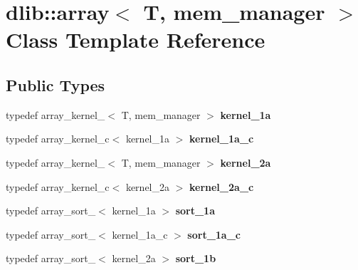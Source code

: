 \hypertarget{classdlib_1_1array}{
\section{dlib::array$<$ T, mem\_\-manager $>$ Class Template Reference}
\label{classdlib_1_1array}
}
\subsection*{Public Types}
\begin{DoxyCompactItemize}
\item 
\hypertarget{classdlib_1_1array_adc0c8cb12a28d10432a13d9eb4c6a487}{
typedef array\_\-kernel\_$<$ T, mem\_\-manager $>$ {\bfseries kernel\_\-1a}}
\label{classdlib_1_1array_adc0c8cb12a28d10432a13d9eb4c6a487}

\item 
\hypertarget{classdlib_1_1array_a5d1b2ce2c97c5ce3457e187ff5c36faa}{
typedef array\_\-kernel\_\-c$<$ kernel\_\-1a $>$ {\bfseries kernel\_\-1a\_\-c}}
\label{classdlib_1_1array_a5d1b2ce2c97c5ce3457e187ff5c36faa}

\item 
\hypertarget{classdlib_1_1array_a5bb3005a519346d4c6b832e4b52755e4}{
typedef array\_\-kernel\_$<$ T, mem\_\-manager $>$ {\bfseries kernel\_\-2a}}
\label{classdlib_1_1array_a5bb3005a519346d4c6b832e4b52755e4}

\item 
\hypertarget{classdlib_1_1array_a40729228e2f077371be2d31e61da5668}{
typedef array\_\-kernel\_\-c$<$ kernel\_\-2a $>$ {\bfseries kernel\_\-2a\_\-c}}
\label{classdlib_1_1array_a40729228e2f077371be2d31e61da5668}

\item 
\hypertarget{classdlib_1_1array_a7a44fa9401279068de3cb18e530ad85a}{
typedef array\_\-sort\_$<$ kernel\_\-1a $>$ {\bfseries sort\_\-1a}}
\label{classdlib_1_1array_a7a44fa9401279068de3cb18e530ad85a}

\item 
\hypertarget{classdlib_1_1array_a834ad38a72079497a6943283a9ce1d19}{
typedef array\_\-sort\_$<$ kernel\_\-1a\_\-c $>$ {\bfseries sort\_\-1a\_\-c}}
\label{classdlib_1_1array_a834ad38a72079497a6943283a9ce1d19}

\item 
\hypertarget{classdlib_1_1array_a86a19518b536ef6e479f671cdf51c098}{
typedef array\_\-sort\_$<$ kernel\_\-2a $>$ {\bfseries sort\_\-1b}}
\label{classdlib_1_1array_a86a19518b536ef6e479f671cdf51c098}


\end{DoxyCompactItemize}

